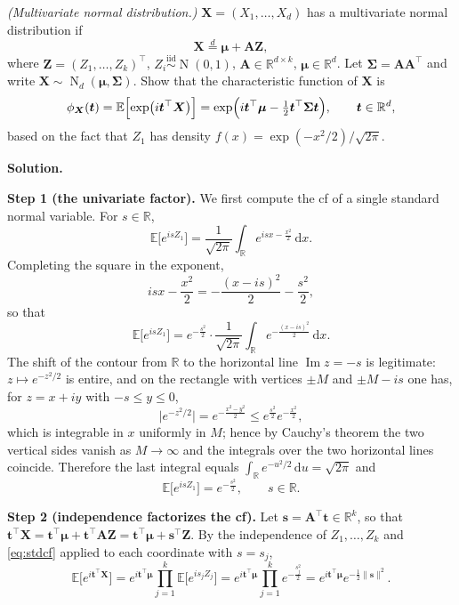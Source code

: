 \documentclass{MFM-hw} %
\date{Oct 27, 2026}
\newcommand{\real}{\mathbb{R}}
\newcommand{\normal}{\operatorname{N}}
\newcommand{\dd}{\,\mathrm{d}}
\newcommand{\E}{\mathbb{E}}
\newcommand{\bX}{\bm{X}}
\newcommand{\bZ}{\bm{Z}}
\newcommand{\bA}{\bm{A}}
\newcommand{\bs}{\bm{s}}
\newcommand{\bt}{\bm{t}}
\newcommand{\bmu}{\bm{\mu}}
\newcommand{\bSigma}{\bm{\Sigma}}
\begin{document}
\maketitle

\HWproblem
\noindent\textit{(Multivariate normal distribution.)} $\bX=(X_1,\dots,X_d)$ has a multivariate normal distribution if
\[
    \bX \overset{d}{=} \bmu + \bA\bZ,
\]
where $\bZ=(Z_1,\dots,Z_k)^\top$, $Z_i\overset{\text{iid}}{\sim}\normal(0,1)$, $\bA\in\real^{d\times k}$, $\bmu\in\real^d$. Let $\bSigma=\bA\bA^\top$ and write $\bX\sim \normal_d(\bmu,\bSigma)$. Show that the characteristic function of $\bX$ is
\[
    \phi_{\bX}(\bt)=\E\Bigl[\exp\bigl(i\bt^\top\bX\bigr)\Bigr]
    =\exp\Bigl(i\bt^\top\bmu-\tfrac12\bt^\top\bSigma\bt\Bigr),\qquad \bt\in\real^d,
\]
based on the fact that $Z_1$ has density $f(x)=\exp(-x^2/2)/\sqrt{2\pi}$.

\medskip
\noindent\textbf{Solution.}

\smallskip
\noindent\textbf{Step 1 (the univariate factor).} We first compute the cf of a single standard normal variable. For $s\in\real$,
\begin{equation}\label{eq:univ}
    \E\bigl[e^{isZ_1}\bigr]
    =\frac{1}{\sqrt{2\pi}}\int_{\real} e^{isx-\frac{x^2}{2}}\dd x .
\end{equation}
Completing the square in the exponent,
\[
    isx-\frac{x^2}{2}=-\frac{(x-is)^2}{2}-\frac{s^2}{2},
\]
so that
\begin{equation}\label{eq:shift}
    \E\bigl[e^{isZ_1}\bigr]
    =e^{-\frac{s^2}{2}}\cdot\frac{1}{\sqrt{2\pi}}\int_{\real}e^{-\frac{(x-is)^2}{2}}\dd x .
\end{equation}
The shift of the contour from $\real$ to the horizontal line $\operatorname{Im}z=-s$ is legitimate: $z\mapsto e^{-z^2/2}$ is entire, and on the rectangle with vertices $\pm M$ and $\pm M-is$ one has, for $z=x+iy$ with $-s\le y\le 0$,
\[
    \bigl|e^{-z^2/2}\bigr| = e^{-\frac{x^2-y^2}{2}}\le e^{\frac{s^2}{2}}e^{-\frac{x^2}{2}},
\]
which is integrable in $x$ uniformly in $M$; hence by Cauchy's theorem the two vertical sides vanish as $M\to\infty$ and the integrals over the two horizontal lines coincide. Therefore the last integral equals $\int_{\real}e^{-u^2/2}\dd u=\sqrt{2\pi}$ and
\begin{equation}\label{eq:stdcf}
    \E\bigl[e^{isZ_1}\bigr]=e^{-\frac{s^2}{2}},\qquad s\in\real .
\end{equation}

\noindent\textbf{Step 2 (independence factorizes the cf).} Let $\bs=\bA^\top\bt\in\real^k$, so that $\bt^\top\bX=\bt^\top\bmu+\bt^\top\bA\bZ=\bt^\top\bmu+\bs^\top\bZ$. By the independence of $Z_1,\dots,Z_k$ and \eqref{eq:stdcf} applied to each coordinate with $s=s_j$,
\[
    \E\bigl[e^{i\bt^\top\bX}\bigr]
    =e^{i\bt^\top\bmu}\prod_{j=1}^{k}\E\bigl[e^{is_jZ_j}\bigr]
    =e^{i\bt^\top\bmu}\prod_{j=1}^{k}e^{-\frac{s_j^2}{2}}
    =e^{i\bt^\top\bmu}e^{-\frac{1}{2}\|\bs\|^2}.
\]
\end{document}
